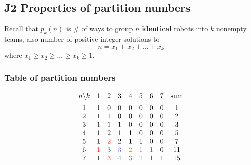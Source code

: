 \documentclass[12pt]{article}
\begin{document}
\subsection{J2 Properties of partition numbers}

Recall that $p_k(n)$ is \# of ways to group $n$ \textbf{identical} robots into $k$ nonempty teams, also number of positive integer solutions to \[n=x_1+x_2+\dots+x_k\] where $x_1\geq x_2\geq \dots \geq x_k\geq 1$.

\subsubsection{Table of partition numbers}

\[\begin{matrix}
    n\backslash k & 1 &2&3&4&5&6&7&\text{sum}\\[0.5em]
    1 &            1&0&0&0&0&  0&         0        & 1\cr             
    2 &            1&              1&0&0& 0&0&0& 2\cr
    3 &            1&              1&              1&   0&0&0&          0       & 3\cr
    4 &            1&              2& \gt 1&               1&0&0&         0        & 5\cr
    5 &            1&   \color{red}2&              2&               1&               1&0&0& 7\cr
    6 & \color{red}1& \gt 3&  \pt3& \color{orange}2& \color{purple}1& \color{magenta}1&      0           & 11\cr
    7 &            1&   \color{red}3& \gt 4&   \pt3& \color{orange}2&  \color{purple}1& \color{magenta}1& 15\cr
\end{matrix}\]
\end{document}
